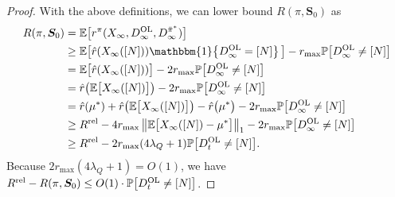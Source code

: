\documentclass[11pt,letterpaper]{article}
\theoremstyle{plain}
\theoremstyle{definition}
\theoremstyle{remark}
\newcommand{\norm}[1]{\left\lVert#1\right\rVert}
\newcommand{\Ebig}[1]{\mathbb{E}\big[#1\big]}
\newcommand{\Probbig}[1]{\mathbb{P}\big[#1\big]}
\newcommand{\indibrac}[1]{\mathbbm{1}\!\left\{#1\right\}}
\newcommand{\ve}[1]{\bm{#1}}
\newcommand{\veS}{\ve{S}}
\newcommand{\rel}{\textup{rel}} %
\newcommand{\rmax}{r_{\max}}
\newcommand{\ravg}{R}
\newcommand{\rsysn}{\ravg(\pi, \veS_0)}
\newcommand{\rrel}{\ravg^\rel}
\newcommand{\pibar}{{\sysbar{\pi}}}
\newcommand{\pibs}{{\pibar^*}}
\newcommand{\sysbar}[1]{\bar{#1}}
\newcommand{\statdist}{\mu^*}
\newcommand{\Da}{D^{\pibs}}
\newcommand{\Db}{D^{\textup{OL}}}
\newcommand{\lamq}{\lambda_{Q}}
\begin{document}
\begin{proof}
    With the above definitions, we can lower bound $\rsysn$ as
    \begin{align*}
        \rsysn 
        &= \Ebig{r^\pi(X_\infty, \Db_\infty, \Da_\infty)}   \\
        &\geq \Ebig{ \hat{r}(X_\infty([N])) \indibrac{\Db_\infty = [N]}} - \rmax \Probbig{\Db_\infty \neq [N]} \\
        &= \Ebig{ \hat{r}(X_\infty([N]))}  - 2\rmax \Probbig{\Db_\infty \neq [N]} \\
        &= \hat{r}\big(\Ebig{X_\infty([N])}\big) - 2\rmax \Probbig{\Db_\infty \neq [N]} \\
        &= \hat{r}(\statdist) + \hat{r}\big(\Ebig{X_\infty([N])}\big) - \hat{r}\big(\statdist\big)   - 2\rmax \Probbig{\Db_\infty \neq [N]} \\
        &\geq  \rrel - 4\rmax \norm{\Ebig{X_\infty([N]) - \statdist}}_1 - 2\rmax \Probbig{\Db_\infty \neq [N]} \\
        &\geq \rrel - 2\rmax(4 \lamq + 1) \Probbig{\Db_t \neq [N]}. 
    \end{align*}
    Because $2\rmax(4 \lamq + 1) = O(1)$, we have $\rrel - \rsysn \leq O(1) \cdot  \Probbig{\Db_t \neq [N]}$. 
\end{proof}



\drifttohighprob*
\end{document}
